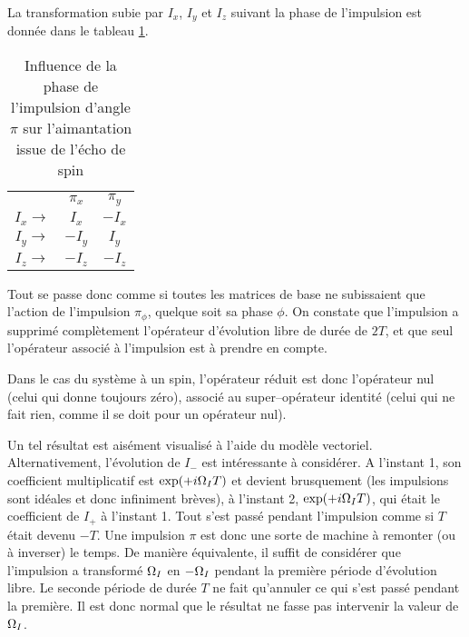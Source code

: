 La transformation subie par $I_x$, $I_y$ et $I_z$ suivant la phase de l'impulsion 
est donnée dans le tableau \ref{tab:echo}.

\begin{table}
\caption{\small Influence de la phase de l'impulsion d'angle $\pi$ sur l'aimantation
issue de l'écho de spin}
\label{tab:echo}
\begin{center}
\begin{tabular}[hbt]{ccc}
                  & $\pi_x$ & $\pi_y$ \\[1.5ex]
$I_x \rightarrow$ & $I_x$   & $-I_x$  \\
$I_y \rightarrow$ & $-I_y$  & $I_y$   \\
$I_z \rightarrow$ & $-I_z$  & $-I_z$
\end{tabular}
\end{center}  
\end{table}

Tout se passe donc comme si toutes les matrices de base ne subissaient que l'action de 
l'impulsion $\pi_{\phi}$, quelque soit sa phase $\phi$.
On constate que l'impulsion a supprimé complètement l'opérateur d'évolution libre 
de durée de $2T$, et que seul l'opérateur 
associé à l'impulsion est à prendre en compte.

Dans le cas du système à un spin, l'opérateur réduit est donc l'opérateur nul (celui
qui donne toujours zéro),
associé au super--opérateur identité (celui qui ne fait rien,
comme il se doit pour un opérateur nul).

Un tel résultat est aisément visualisé à l'aide du modèle vectoriel.
Alternativement, l'évolution de $I_-$ est intéressante à considérer.
A l'instant 1, son coefficient multiplicatif est $\exp(+i\Omega_I T)$ et devient
brusquement (les impulsions sont idéales et donc infiniment brèves),
à l'instant 2, $\exp(+i\Omega_I T)$,
qui était le coefficient de $I_+$ à l'instant 1.
Tout s'est passé pendant l'impulsion comme si $T$ était devenu $-T$.
Une impulsion $\pi$ est donc une sorte de machine à remonter (ou à inverser) le temps.
De manière équivalente, il suffit de considérer que l'impulsion a
transformé $\Omega_I$ en $-\Omega_I$ pendant la première période d'évolution libre.
Le seconde période de durée $T$ ne fait qu'annuler ce qui s'est passé pendant la première.
Il est donc normal que le résultat ne fasse pas intervenir la valeur de $\Omega_I$.


